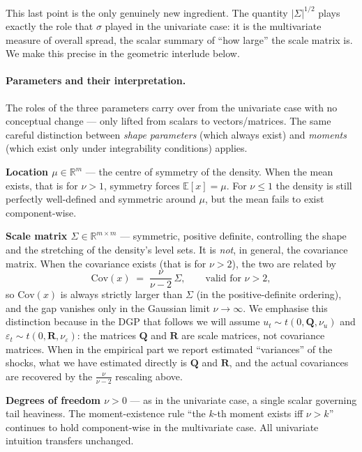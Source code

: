 \documentclass[11pt, a4paper, oneside]{article}
\begin{document}
This last point is the only genuinely new ingredient. The quantity
$|\Sigma|^{1/2}$ plays exactly the role that $\sigma$ played in the
univariate case: it is the multivariate measure of overall spread, the
scalar summary of ``how large'' the scale matrix is. We make this precise
in the geometric interlude below.

\paragraph{Parameters and their interpretation.}
The roles of the three parameters carry over from the univariate case
with no conceptual change — only lifted from scalars to vectors/matrices.
The same careful distinction between \emph{shape parameters} (which
always exist) and \emph{moments} (which exist only under integrability
conditions) applies.

\textbf{Location $\mu \in \mathbb{R}^{m}$} — the centre of symmetry of
the density. When the mean exists, that is for $\nu > 1$, symmetry
forces $\mathbb{E}[x] = \mu$. For $\nu \leq 1$ the density is still
perfectly well-defined and symmetric around $\mu$, but the mean fails
to exist component-wise.

\textbf{Scale matrix $\Sigma \in \mathbb{R}^{m \times m}$} — symmetric,
positive definite, controlling the shape and the stretching of the
density's level sets. It is \emph{not}, in general, the covariance
matrix. When the covariance exists (that is for $\nu > 2$), the two are
related by
\[
\mathrm{Cov}(x) \;=\; \frac{\nu}{\nu - 2}\,\Sigma,
\qquad \text{valid for } \nu > 2,
\]
so $\mathrm{Cov}(x)$ is always strictly larger than $\Sigma$ (in the
positive-definite ordering), and the gap vanishes only in the Gaussian
limit $\nu \to \infty$. We emphasise this distinction because in the
DGP that follows we will assume $u_t \sim t(0, \mathbf{Q}, \nu_u)$ and
$\varepsilon_t \sim t(0, \mathbf{R}, \nu_\varepsilon)$: the matrices
$\mathbf{Q}$ and $\mathbf{R}$ are scale matrices, not covariance
matrices. When in the empirical part we report estimated ``variances''
of the shocks, what we have estimated directly is $\mathbf{Q}$ and
$\mathbf{R}$, and the actual covariances are recovered by the
$\tfrac{\nu}{\nu - 2}$ rescaling above.

\textbf{Degrees of freedom $\nu > 0$} — as in the univariate case, a
single scalar governing tail heaviness. The moment-existence rule
``the $k$-th moment exists iff $\nu > k$'' continues to hold
component-wise in the multivariate case. All univariate intuition
transfers unchanged.
\end{document}
